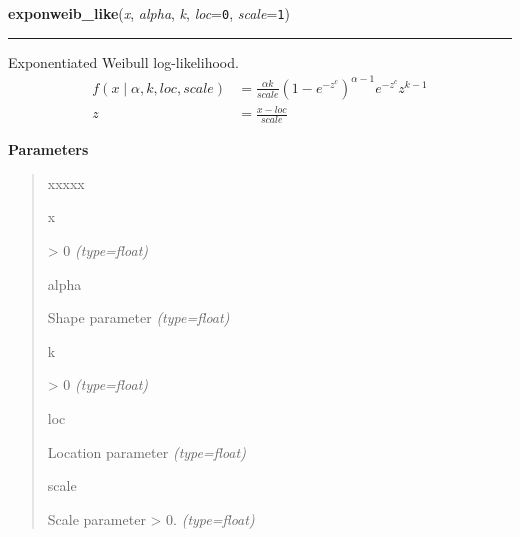     \begin{boxedminipage}{\textwidth}

    \raggedright \textbf{exponweib\_like}(\textit{x}, \textit{alpha}, \textit{k}, \textit{loc}=\texttt{0}, \textit{scale}=\texttt{1})

    \vspace{-1.5ex}

    \rule{\textwidth}{0.5\fboxrule}

Exponentiated Weibull log-likelihood.
\begin{equation*}\begin{split}f(x \mid \alpha,k,loc,scale)  & = \frac{\alpha k}{scale} (1-e^{-z^c})^{\alpha-1} e^{-z^c} z^{k-1} \\z & = \frac{x-loc}{scale}\end{split}\end{equation*}    \vspace{1ex}

      \textbf{Parameters}
      \begin{quote}
        \begin{Ventry}{xxxxx}

          \item[x]


{\textgreater} 0
            \textit{(type=float)}

          \item[alpha]


Shape parameter
            \textit{(type=float)}

          \item[k]


{\textgreater} 0
            \textit{(type=float)}

          \item[loc]


Location parameter
            \textit{(type=float)}

          \item[scale]


Scale parameter {\textgreater} 0.
            \textit{(type=float)}

        \end{Ventry}

      \end{quote}

    \vspace{1ex}

    \end{boxedminipage}

    \label{pymc:distributions:rgamma}

